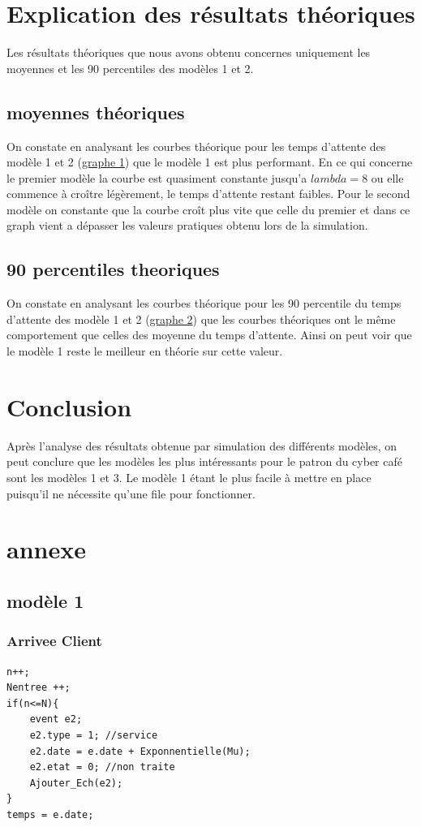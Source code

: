 \documentclass[a4paper,11pt]{article}
\begin{document}
\section{Explication des résultats théoriques}
	Les résultats théoriques que nous avons obtenu concernes uniquement les moyennes et les 90 percentiles des modèles 1 et 2.\\
	\subsection{moyennes théoriques}
	On constate en analysant les courbes théorique pour les temps d'attente des modèle 1 et 2 (\hyperref[fig1]{graphe 1}) que le modèle 1 est plus performant. En ce qui concerne le premier modèle la courbe est quasiment constante jusqu'a $lambda = 8$ ou elle commence à croître légèrement, le temps d'attente restant faibles.
	Pour le second modèle on constante que la courbe croît plus vite que celle du premier et dans ce graph vient a dépasser les valeurs pratiques obtenu lors de la simulation.
	\subsection{90 percentiles theoriques}
	On constate en analysant les courbes théorique pour les 90 percentile du temps d'attente des modèle 1 et 2 (\hyperref[fig2]{graphe 2}) que les courbes théoriques ont le même comportement que celles des moyenne du temps d'attente.
	Ainsi on peut voir que le modèle 1 reste le meilleur en théorie sur cette valeur.
	
\section{Conclusion}
	Après l'analyse des résultats obtenue par simulation des différents modèles, on peut conclure que les modèles les plus intéressants pour le patron du cyber café sont les modèles 1 et 3. Le modèle 1 étant le plus facile à mettre en place puisqu'il ne nécessite qu'une file pour fonctionner.
	
\section{annexe}
\label{annexe}
	\subsection{modèle 1}
		\subsubsection{Arrivee Client}
	\begin{lstlisting}
n++; 
Nentree ++; 
if(n<=N){
	event e2;
	e2.type = 1; //service
	e2.date = e.date + Exponnentielle(Mu);
	e2.etat = 0; //non traite
	Ajouter_Ech(e2);
}
temps = e.date;
	\end{lstlisting}
\end{document}
